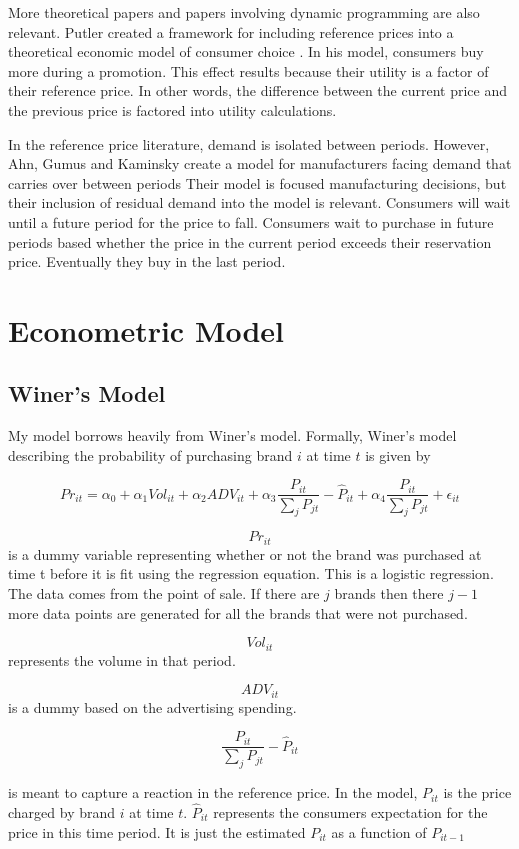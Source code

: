 \documentclass{article}
\begin{document}
More theoretical papers and papers involving dynamic programming are also relevant. Putler created a framework for including reference prices into a theoretical economic model of consumer choice \cite{putler}. In his model, consumers buy more during a promotion. This effect results because their utility is a factor of their reference price. In other words, the difference between the current price and the previous price is factored into utility calculations.

In the reference price literature, demand is isolated between periods. However, Ahn, Gumus and Kaminsky create a model for manufacturers facing demand that carries over between periods \cite{ahn} Their model is focused manufacturing decisions, but their inclusion of residual demand into the model is relevant. Consumers will wait until a future period for the price to fall. Consumers wait to purchase in future periods based whether the price in the current period exceeds their reservation price. Eventually they buy in the last period.

\section{Econometric Model}

\subsection{Winer's Model}
My model borrows heavily from Winer's model. Formally, Winer's model describing the probability of purchasing brand $i$ at time $t$ is given by

$$ {Pr}_{it} = \alpha_0 + \alpha_1 Vol_{it} + \alpha_2 ADV_{it} +  \alpha_3 \dfrac{P_{it}} {\sum_j P_{jt}} - \hat{P}_{it}+ \alpha_4 \dfrac {P_{it}}{\sum_j P_{jt}} + \epsilon_{it}$$

$${Pr}_{it}$$ is a dummy variable representing whether or not the brand was purchased at time t before it is fit using the regression equation. This is a logistic regression. The data comes from the point of sale. If there are $j$ brands then there $j-1$ more data points are generated for all the brands that were not purchased.

$$Vol_{it}$$ represents the volume in that period. 

$$ADV_{it}$$ is a dummy based on the advertising spending.

$$\dfrac{P_{it}} {\sum_j P_{jt}} - \hat{P}_{it}$$

 is meant to capture a reaction in the reference price.  In the model, $P_{it}$ is the price charged by brand $i$ at time $t$. $\hat{P}_{it}$ represents the consumers expectation for the price in this time period. It is just the estimated ${P}_{it}$ as a function of ${P}_{it-1}$ 
\end{document}
